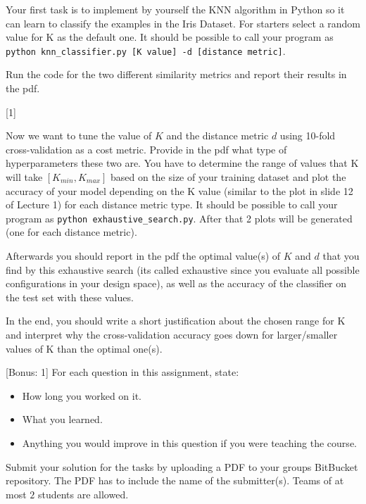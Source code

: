 \documentclass{exam}
\begin{document}
\begin{questions}
\begin{itemize}
		\end{itemize}	
		
		Your first task is to implement by yourself the KNN algorithm in Python so it can learn to classify the examples in the Iris Dataset. For starters select a random value for K as the default one. It should be possible to call your program as \texttt{python knn\_classifier.py [K value] -d [distance metric]}.
			
		Run the code for the two different similarity metrics and report their results in the pdf.
		
		[1]
		
		Now we want to tune the value of $K$ and the distance metric $d$ using 10-fold cross-validation as a cost metric. 
		Provide in the pdf what type of hyperparameters these two are.
		You have to determine the range of values that K will take $[K_{min}, K_{max}]$ based on the size of your training dataset and plot the accuracy of your model depending on the K value (similar to the plot in slide 12 of Lecture 1) for each distance metric type. 
		It should be possible to call your program as \texttt{python exhaustive\_search.py}. After that 2 plots will be generated (one for each distance metric).
		
		Afterwards you should report in the pdf the optimal value(s) of $K$ and $d$ that you find by this exhaustive search (its called exhaustive since you evaluate all possible configurations in your design space), as well as the accuracy of the classifier on the test set with these values. 
		
		In the end, you should write a short justification about the chosen range for K and interpret why the cross-validation accuracy goes down for larger/smaller values of K than the optimal one(s).

		
		[Bonus: 1]
		For each question in this assignment, state:
		\begin{itemize}
			\item How long you worked on it.
			\item What you learned.
			\item Anything you would improve in this question if you were teaching the course.
		\end{itemize}
	\end{questions}
	
	\noindent
	Submit your solution for the tasks by uploading a PDF to your groups BitBucket repository. The PDF has to include the name of the submitter(s). Teams of at most $2$ students are allowed.
\end{document}
